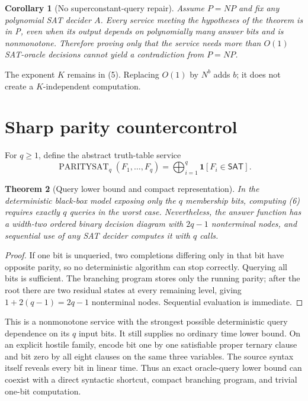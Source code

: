 \documentclass[11pt]{article}
\newtheorem{theorem}{Theorem}
\newtheorem{corollary}[theorem]{Corollary}
\newcommand{\SAT}{\mathsf{SAT}}
\begin{document}
\begin{corollary}[No superconstant-query repair]
Assume $P=NP$ and fix any polynomial SAT decider $A$.  Every service meeting
the hypotheses of the theorem is in P, even when its output depends on
polynomially many answer bits and is nonmonotone.  Therefore proving only
that the service needs more than $O(1)$ SAT-oracle decisions cannot yield a
contradiction from $P=NP$.
\end{corollary}

The exponent $K$ remains in (5).  Replacing $O(1)$ by $N^b$ adds $b$; it
does not create a $K$-independent computation.

\section{Sharp parity countercontrol}

For $q\ge1$, define the abstract truth-table service
\[
 \operatorname{PARITYSAT}_q(F_1,\ldots,F_q)
 =\bigoplus_{i=1}^q\mathbf1[F_i\in\SAT].                  \tag{6}
\]

\begin{theorem}[Query lower bound and compact representation]
In the deterministic black-box model exposing only the $q$ membership bits,
computing (6) requires exactly $q$ queries in the worst case.  Nevertheless,
the answer function has a width-two ordered binary decision diagram with
$2q-1$ nonterminal nodes, and sequential use of any SAT decider computes it
with $q$ calls.
\end{theorem}

\begin{proof}
If one bit is unqueried, two completions differing only in that bit have
opposite parity, so no deterministic algorithm can stop correctly.  Querying
all bits is sufficient.  The branching program stores only the running
parity; after the root there are two residual states at every remaining
level, giving $1+2(q-1)=2q-1$ nonterminal nodes.  Sequential evaluation is
immediate.
\end{proof}

This is a nonmonotone service with the strongest possible deterministic
query dependence on its $q$ input bits.  It still supplies no ordinary time
lower bound.  On an explicit hostile family, encode bit one by one satisfiable
proper ternary clause and bit zero by all eight clauses on the same three
variables.  The source syntax itself reveals every bit in linear time.  Thus
an exact oracle-query lower bound can coexist with a direct syntactic shortcut,
compact branching program, and trivial one-bit computation.
\end{document}
